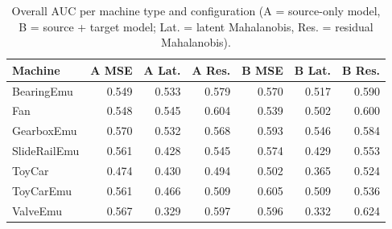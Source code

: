\begin{table}[!htb]
\centering
\caption{Overall AUC per machine type and configuration (A = source-only model, B = source + target model; Lat. = latent Mahalanobis, Res. = residual Mahalanobis).}
\label{tab:machine_auc}
\footnotesize
\renewcommand{\arraystretch}{1.18}
\begin{tabular}{lrrrrrr}
\toprule
Machine & A MSE & A Lat. & A Res. & B MSE & B Lat. & B Res. \\
\midrule
BearingEmu & 0.549 & 0.533 & 0.579 & 0.570 & 0.517 & 0.590 \\
Fan & 0.548 & 0.545 & 0.604 & 0.539 & 0.502 & 0.600 \\
GearboxEmu & 0.570 & 0.532 & 0.568 & 0.593 & 0.546 & 0.584 \\
SlideRailEmu & 0.561 & 0.428 & 0.545 & 0.574 & 0.429 & 0.553 \\
ToyCar & 0.474 & 0.430 & 0.494 & 0.502 & 0.365 & 0.524 \\
ToyCarEmu & 0.561 & 0.466 & 0.509 & 0.605 & 0.509 & 0.536 \\
ValveEmu & 0.567 & 0.329 & 0.597 & 0.596 & 0.332 & 0.624 \\
\bottomrule
\end{tabular}
\end{table}